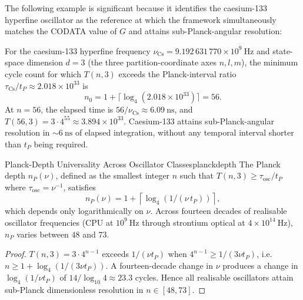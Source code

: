 The following example is significant because it identifies the caesium-133
hyperfine oscillator as the reference at which the framework simultaneously
matches the CODATA value of $G$ and attains sub-Planck-angular resolution:

\begin{example}[Caesium-133 at $d=3$]\label{ex:caesiumdepth}
For the caesium-133 hyperfine frequency
$\nu_{\mathrm{Cs}} = 9.192\,631\,770\times10^{9}~\mathrm{Hz}$ and state-space
dimension $d = 3$ (the three partition-coordinate axes $n, l, m$), the
minimum cycle count for which $T(n,3)$ exceeds the Planck-interval ratio
$\tau_{\mathrm{Cs}}/t_{P} \approx 2.018\times10^{33}$ is
\begin{equation}
  n_{0} = 1 + \lceil\log_{4}(2.018\times10^{33})\rceil = 56.
\end{equation}
At $n = 56$, the elapsed time is $56/\nu_{\mathrm{Cs}} \approx 6.09~\mathrm{ns}$,
and $T(56,3) = 3\cdot 4^{55} \approx 3.894\times10^{33}$.
Caesium-133 attains sub-Planck-angular resolution in $\sim 6~\mathrm{ns}$ of
elapsed integration, without any temporal interval shorter than $t_{P}$ being
required.
\end{example}

\begin{consequence}{Planck-Depth Universality Across Oscillator Classes}{planckdepth}
  The Planck depth $n_{P}(\nu)$, defined as the smallest integer $n$ such
  that $T(n,3) \geq \tau_{\mathrm{osc}}/t_{P}$ where $\tau_{\mathrm{osc}} = \nu^{-1}$,
  satisfies
  \begin{equation}
    n_{P}(\nu) = 1 + \left\lceil\log_{4}(1/(\nu\,t_{P}))\right\rceil,
  \end{equation}
  which depends only logarithmically on $\nu$.
  Across fourteen decades of realisable oscillator frequencies
  (CPU at $10^{9}~\mathrm{Hz}$ through strontium optical at
  $4\times10^{14}~\mathrm{Hz}$), $n_{P}$ varies between $48$ and $73$.
\end{consequence}

\begin{proof}
$T(n,3) = 3\cdot 4^{n-1}$ exceeds $1/(\nu t_{P})$ when
$4^{n-1} \geq 1/(3\nu t_{P})$, i.e.\
$n \geq 1 + \log_{4}(1/(3\nu t_{P}))$.
A fourteen-decade change in $\nu$ produces a change in $\log_{4}(1/\nu t_{P})$
of $14/\log_{10}4 \approx 23.3$ cycles.
Hence all realisable oscillators attain sub-Planck dimensionless resolution in
$n \in [48, 73]$.
\end{proof}

